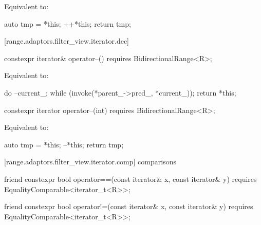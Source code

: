 {\begin{itemdescr}
\pnum
\effects Equivalent to:
\begin{codeblock}
auto tmp = *this;
++*this;
return tmp;
\end{codeblock}
\end{itemdescr}

[range.adaptors.filter_view.iterator.dec]{}

%
\begin{itemdecl}
constexpr iterator& operator--() requires BidirectionalRange<R>;
\end{itemdecl}

\begin{itemdescr}
\pnum
\effects Equivalent to:
\begin{codeblock}
do
  --current_;
while (invoke(*parent_->pred_, *current_));
return *this;
\end{codeblock}
\end{itemdescr}

%
\begin{itemdecl}
constexpr iterator operator--(int) requires BidirectionalRange<R>;
\end{itemdecl}

\begin{itemdescr}
\pnum
\effects Equivalent to:
\begin{codeblock}
auto tmp = *this;
--*this;
return tmp;
\end{codeblock}
\end{itemdescr}

[range.adaptors.filter_view.iterator.comp]{ comparisons}

%
\begin{itemdecl}
friend constexpr bool operator==(const iterator& x, const iterator& y)
  requires EqualityComparable<iterator_t<R>>;
\end{itemdecl}

\begin{itemdescr}
\pnum
\oldtxt{\returns} 
\end{itemdescr}

%
\begin{itemdecl}
friend constexpr bool operator!=(const iterator& x, const iterator& y)
  requires EqualityComparable<iterator_t<R>>;
\end{itemdecl}

}
